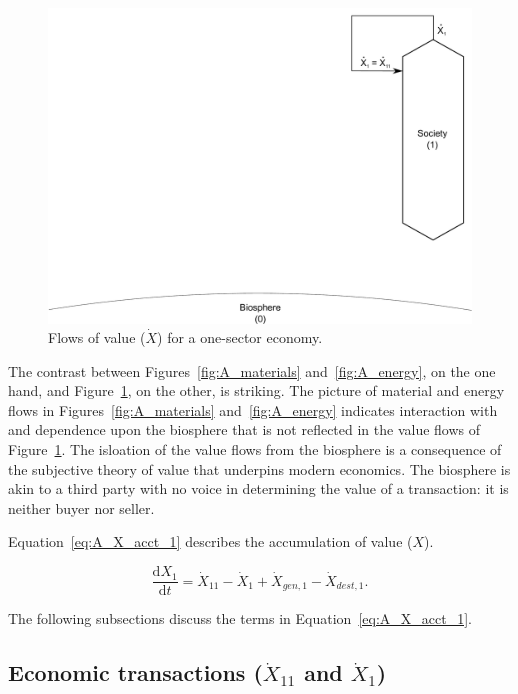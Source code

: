 \begin{figure}[!ht]
\centering
\includegraphics[width=0.8\linewidth]{Part_2/Chapter_Values/images/1_sector_value.pdf}
\caption[Flows of value for a one-sector economy]{Flows of value ($\dot{X}$) for a one-sector economy.}
\label{fig:A_value} 
\end{figure}

The contrast between Figures~\ref{fig:A_materials} and~\ref{fig:A_energy}, 
on the one hand, 
and Figure~\ref{fig:A_value}, 
on the other, is striking.  
The picture of material and energy flows in 
Figures~\ref{fig:A_materials} and~\ref{fig:A_energy} 
indicates interaction with and dependence upon the biosphere 
that is not reflected in the value flows of Figure~\ref{fig:A_value}.
The isloation of the value flows from the biosphere is a consequence
of the subjective theory of value 
that underpins modern economics.
The biosphere is akin to a third party with no voice 
in determining the value of a transaction:
it is neither buyer nor seller. 

Equation~\ref{eq:A_X_acct_1} describes the accumulation 
of value ($X$).

\begin{equation} \label{eq:A_X_acct_1}
	\frac{\mathrm{d}X_{1}}{\mathrm{d}t} 
	= \dot{X}_{11} 
	- \dot{X}_{1}
	+ \dot{X}_{gen,1}
	- \dot{X}_{dest,1}.
\end{equation}

\noindent{} The following subsections discuss the terms in Equation~\ref{eq:A_X_acct_1}.


\subsection{Economic transactions ($\dot{X}_{11}$ and $\dot{X}_{1}$)}

